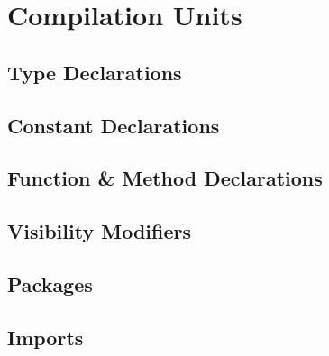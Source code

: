 \chapter{Compilation Units}
\section{Type Declarations}
\section{Constant Declarations}
\section{Function \& Method Declarations}
\section{Visibility Modifiers}
\section{Packages}
\section{Imports}




